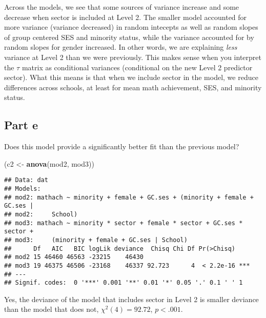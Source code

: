 \documentclass[]{article}
\newenvironment{Shaded}{\begin{snugshade}}{\end{snugshade}}
\newcommand{\KeywordTok}[1]{\textcolor[rgb]{0.13,0.29,0.53}{\textbf{#1}}}
\newcommand{\StringTok}[1]{\textcolor[rgb]{0.31,0.60,0.02}{#1}}
\newcommand{\NormalTok}[1]{#1}
\begin{document}
Across the models, we see that some sources of variance increase and
some decrease when sector is included at Level 2. The smaller model
accounted for more variance (variance decreased) in random intecepts as
well as random slopes of group centered SES and minority status, while
the variance accounted for by random slopes for gender increased. In
other words, we are explaining \emph{less} variance at Level 2 than we
were previously. This makes sense when you interpret the \(\tau\) matrix
as conditional variances (conditional on the new Level 2 predictor
sector). What this means is that when we include sector in the model, we
reduce differences across schools, at least for mean math achievement,
SES, and minority status.

\subsection{Part e}\label{part-e-1}

Does this model provide a significantly better fit than the previous
model?

\begin{Shaded}
\begin{Highlighting}[]
\NormalTok{(c2 <-}\StringTok{ }\KeywordTok{anova}\NormalTok{(mod2, mod3))}
\end{Highlighting}
\end{Shaded}

\begin{verbatim}
## Data: dat
## Models:
## mod2: mathach ~ minority + female + GC.ses + (minority + female + GC.ses | 
## mod2:     School)
## mod3: mathach ~ minority * sector + female * sector + GC.ses * sector + 
## mod3:     (minority + female + GC.ses | School)
##      Df   AIC   BIC logLik deviance  Chisq Chi Df Pr(>Chisq)    
## mod2 15 46460 46563 -23215    46430                             
## mod3 19 46375 46506 -23168    46337 92.723      4  < 2.2e-16 ***
## ---
## Signif. codes:  0 '***' 0.001 '**' 0.01 '*' 0.05 '.' 0.1 ' ' 1
\end{verbatim}

Yes, the deviance of the model that includes sector in Level 2 is
smaller deviance than the model that does not, \(\chi^2(4) = 92.72\),
\(p<.001\).
\end{document}
